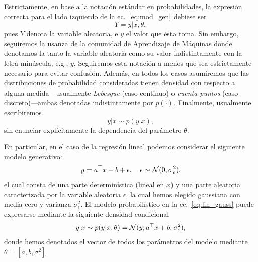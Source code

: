 \begin{mdframed}[style=discusion, frametitle={\center Notación sobre variables aleatorias}]
 Estrictamente, en base a la notación estándar en probabilidades, la expresión  correcta para el lado izquierdo de la ec.~\eqref{eq:mod_gen} debiese ser  
 \begin{equation}
  	Y=y|x,\theta,
  \end{equation}
  pues $Y$ denota la variable aleatoria, e $y$ el valor que ésta toma. Sin embargo, seguiremos la usanza de la comunidad de Aprendizaje de Máquinas donde denotamos la tanto la variable aleatoria como su valor indistintamente con la letra minúscula, e.g., $y$. Seguiremos esta notación a menos que sea estrictamente necesario para evitar confusión. Además, en todos los casos asumiremos que las distribuciones de probabilidad consideradas tienen densidad con respecto a alguna medida---usualmente \emph{Lebesgue} (caso continuo) o \emph{cuenta-puntos} (caso discreto)---ambas denotadas indistintamente por $p(\cdot)$.  Finalmente, usualmente escribiremos 
  \begin{equation}
  	y|x \sim p(y|x),
  \end{equation}
  sin enunciar explícitamente la dependencia del parámetro $\theta$.
\end{mdframed}


En particular, en el caso de la regresión lineal podemos considerar el siguiente modelo  generativo:
\begin{equation}
	y = a^\top x + b + \epsilon,\quad \epsilon\sim{\mathcal N}(0,\sigma_\epsilon^2),
	\label{eq:lin_gauss}
\end{equation}
el cual consta de una parte determinística (lineal en $x$) y una parte aleatoria caracterizada por la variable aleatoria $\epsilon$, la cual hemos  elegido gaussiana con media cero y varianza $\sigma_\epsilon^2$. El modelo probabilístico en la ec.~\eqref{eq:lin_gauss} puede expresarse mediante la siguiente densidad condicional 
\begin{equation}
	y|x \sim p(y|x,\theta) = {\mathcal N}(y;a^\top x + b ,\sigma_\epsilon^2),\label{eq:mod_lin_gau}
\end{equation}
donde hemos denotados el vector de todos los parámetros del modelo mediante $\theta = [a,b,\sigma_\epsilon^2]$.

